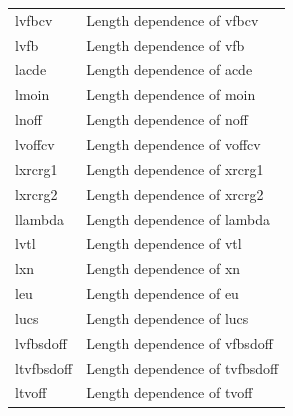 \begin{longtable}{l l}
{\small lvfbcv} & {\small Length dependence of vfbcv} \\
{\small lvfb} & {\small Length dependence of vfb} \\
{\small lacde} & {\small Length dependence of acde} \\
{\small lmoin} & {\small Length dependence of moin} \\
{\small lnoff} & {\small Length dependence of noff} \\
{\small lvoffcv} & {\small Length dependence of voffcv} \\
{\small lxrcrg1} & {\small Length dependence of xrcrg1} \\
{\small lxrcrg2} & {\small Length dependence of xrcrg2} \\
{\small llambda} & {\small Length dependence of lambda} \\
{\small lvtl} & {\small Length dependence of vtl} \\
{\small lxn} & {\small Length dependence of xn} \\
{\small leu} & {\small Length dependence of eu} \\
{\small lucs} & {\small Length dependence of lucs} \\
{\small lvfbsdoff} & {\small Length dependence of vfbsdoff} \\
{\small ltvfbsdoff} & {\small Length dependence of tvfbsdoff} \\
{\small ltvoff} & {\small Length dependence of tvoff} \\


\end{longtable}
